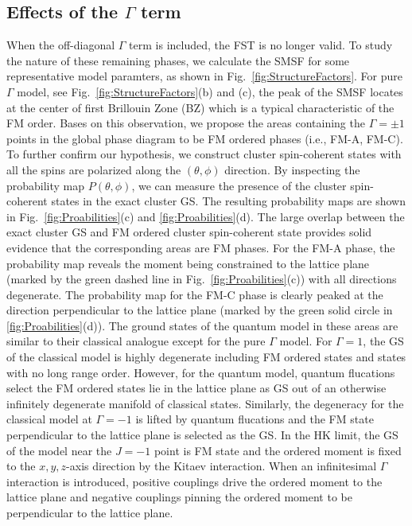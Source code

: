 \documentclass[aps,prb,reprint,amsfonts,amsmath,amssymb,showpacs,groupedaddress,superscriptaddress]{revtex4-1}
\begin{document}
\subsection{\label{subsec:GammaEffects}Effects of the $\Gamma$ term}
When the off-diagonal $\Gamma$ term is included, the FST is no longer valid. To study the nature of these remaining phases, we calculate the SMSF for some representative model paramters, as shown in Fig.~\ref{fig:StructureFactors}. For pure $\Gamma$ model, see Fig.~\ref{fig:StructureFactors}(b) and (c), the peak of the SMSF locates at the center of first Brillouin Zone (BZ) which is a typical characteristic of the FM order. Bases on this observation, we propose the areas containing the $\Gamma=\pm 1$ points in the global phase diagram to be FM ordered phases (i.e., FM-A, FM-C). To further confirm our hypothesis, we construct cluster spin-coherent states with all the spins are polarized along the $(\theta, \phi)$ direction. By inspecting the probability map $P(\theta, \phi)$, we can measure the presence of the cluster spin-coherent states in the exact cluster GS. The resulting probability maps are shown in Fig.~\ref{fig:Proabilities}(c) and \ref{fig:Proabilities}(d). The large overlap between the exact cluster GS and FM ordered cluster spin-coherent state provides solid evidence that the corresponding areas are FM phases. For the FM-A phase, the probability map reveals the moment being constrained to the lattice plane (marked by the green dashed line in Fig.~\ref{fig:Proabilities}(c)) with all directions degenerate. The probability map for the FM-C phase is clearly peaked at the direction perpendicular to the lattice plane (marked by the green solid circle in \ref{fig:Proabilities}(d)). The ground states of the quantum model in these areas are similar to their classical analogue except for the pure $\Gamma$ model. For $\Gamma=1$, the GS of the classical model is highly degenerate including FM ordered states and states with no long range order. However, for the quantum model, quantum flucations select the FM ordered states lie in the lattice plane as GS out of an otherwise infinitely degenerate manifold of classical states. Similarly, the degeneracy for the classical model at $\Gamma=-1$ is lifted by quantum flucations and the FM state perpendicular to the lattice plane is selected as the GS. In the HK limit, the GS of the model near the $J=-1$ point is FM state and the ordered moment is fixed to the $x,y,z$-axis direction by the Kitaev interaction. When an infinitesimal $\Gamma$ interaction is introduced, positive couplings drive the ordered moment to the lattice plane and negative couplings pinning the ordered moment to be perpendicular to the lattice plane.
\end{document}
